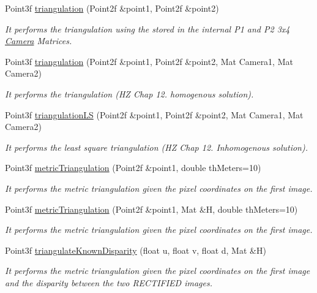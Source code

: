 \begin{DoxyCompactItemize}
Point3f \hyperlink{classStereoCamera_a3c8ef84424fa111c63437a3db8f04333}{triangulation} (Point2f \&point1, Point2f \&point2)
\begin{DoxyCompactList}\small\item\em It performs the triangulation using the stored in the internal P1 and P2 3x4 \hyperlink{classCamera}{Camera} Matrices. \end{DoxyCompactList}\item 
Point3f \hyperlink{classStereoCamera_ab68c8d3bd07f542243d681fbe8c8c6b7}{triangulation} (Point2f \&point1, Point2f \&point2, Mat Camera1, Mat Camera2)
\begin{DoxyCompactList}\small\item\em It performs the triangulation (H\+Z Chap 12. homogenous solution). \end{DoxyCompactList}\item 
Point3f \hyperlink{classStereoCamera_aaef25d8723eefdbab6e27c348492126b}{triangulation\+L\+S} (Point2f \&point1, Point2f \&point2, Mat Camera1, Mat Camera2)
\begin{DoxyCompactList}\small\item\em It performs the least square triangulation (H\+Z Chap 12. Inhomogenous solution). \end{DoxyCompactList}\item 
Point3f \hyperlink{classStereoCamera_a2fcd3e1767bcf04716b0e2ac76098430}{metric\+Triangulation} (Point2f \&point1, double th\+Meters=10)
\begin{DoxyCompactList}\small\item\em It performs the metric triangulation given the pixel coordinates on the first image. \end{DoxyCompactList}\item 
Point3f \hyperlink{classStereoCamera_a3cf53fac6336eea107a26bd5cdbbdd03}{metric\+Triangulation} (Point2f \&point1, Mat \&H, double th\+Meters=10)
\begin{DoxyCompactList}\small\item\em It performs the metric triangulation given the pixel coordinates on the first image. \end{DoxyCompactList}\item 
Point3f \hyperlink{classStereoCamera_a761ea623c4cde38b4fa1d798ef09b7ae}{triangulate\+Known\+Disparity} (float u, float v, float d, Mat \&H)
\begin{DoxyCompactList}\small\item\em It performs the metric triangulation given the pixel coordinates on the first image and the disparity between the two R\+E\+C\+T\+I\+F\+I\+E\+D images. \end{DoxyCompactList}\item 

\end{DoxyCompactItemize}
